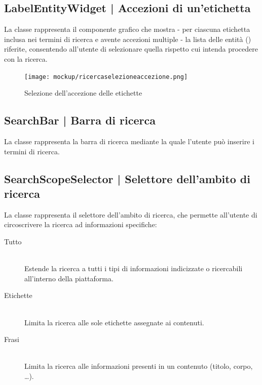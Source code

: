 \documentclass[10pt,a4paper,headinclude,footinclude,hidelinks]{scrreprt} %
\begin{document}
	\subsection[LabelEntityWidget]{LabelEntityWidget | Accezioni di un'etichetta}
	\label{sec:stage:design:sistema:view.search:label-entity-list}
	La classe \textit{} rappresenta il componente grafico che mostra - per ciascuna etichetta inclusa nei termini di ricerca e avente accezioni multiple - la lista delle entità (\textit{}) riferite, consentendo all'utente di selezionare quella rispetto cui intenda procedere con la ricerca.

	\begin{figure}[ht]
		\begin{center}
	    	\texttt{[image: mockup/ricercaselezioneaccezione.png]}
			\label{gfx:mockup:label-entity}
			\caption{Selezione dell'accezione delle etichette}
		\end{center}
	\end{figure}

	\subsection[SearchBar]{SearchBar | Barra di ricerca}
	\label{sec:stage:design:sistema:view.search:search-bar}
	La classe \textit{} rappresenta la barra di ricerca mediante la quale l'utente può inserire i termini di ricerca.

	\subsection[SearchScopeSelector]{SearchScopeSelector | Selettore dell'ambito di ricerca}
	\label{sec:stage:design:sistema:view.search:search-scope-selector}
	La classe \textit{} rappresenta il selettore dell'ambito di ricerca, che permette all'utente di circoscrivere la ricerca ad informazioni specifiche:
	\begin{description}
	\item[Tutto] \hfill \\
	Estende la ricerca a tutti i tipi di informazioni indicizzate o ricercabili all'interno della piattaforma.
 	\item[Etichette] \hfill \\
	Limita la ricerca alle sole etichette assegnate ai contenuti.
	\item[Frasi] \hfill \\
	Limita la ricerca alle informazioni presenti in un contenuto (titolo, corpo, \ldots).
	\end{description}
\end{document}
